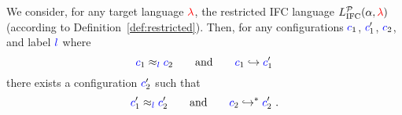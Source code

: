 \documentclass{llncs}
\newcommand{\Red}[1]{{\color{red} #1}}
\begin{document}
\begin{lemma}
  \label{lemma:rr-tsni-general}
  We consider, for any target language \ensuremath{\Red{\lambda}},
  the restricted IFC language \ensuremath{L_\text{IFC}^{\mathcal{P}}(\alpha,\Red{\lambda})}
  (according to Definition~\ref{def:restricted}).
  Then,
  for any configurations \ensuremath{\ifc{c}_{1}}, \ensuremath{\ifc{c}_{1}'}, \ensuremath{\ifc{c}_{2}}, and label \ensuremath{\ifc{l}} where
  \begin{equation} \label{eq:tsni-lemma-lhs}
  {\color{blue} c}_{1} \approx_{{\color{blue} l}} {\color{blue} c}_{2}
  \qquad \text{and} \qquad
  {\color{blue} c}_{1} \hookrightarrow {\color{blue} c}_{1}'
  \end{equation}
  there exists a configuration \ensuremath{\ifc{c}_{2}'} such that
  \begin{equation} \label{eq:tsni-lemma-rhs}
  {\color{blue} c}_{1}' \approx_{{\color{blue} l}} {\color{blue} c}_{2}'
  \qquad \text{and} \qquad
  {\color{blue} c}_{2} \hookrightarrow^* {\color{blue} c}_{2}'
  \ \text{.}
  \end{equation}
\end{lemma}
\end{document}
